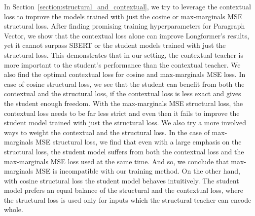 In Section~\ref{section:structural_and_contextual}, we try to leverage the
contextual loss to improve the models trained with just the cosine or
max-marginals MSE structural loss. After finding promising training
hyperparameters for Paragraph Vector, we show that the contextual loss alone
can improve Longformer's results, yet it cannot surpass SBERT or the student
models trained with just the structural loss. This demonstrates that in our
setting, the contextual teacher is more important to the student's performance
than the contextual teacher. We also find the optimal contextual loss for
cosine and max-marginals MSE loss. In case of cosine structural loss, we see
that the student can benefit from both the contextual and the structural loss,
if the contextual loss is less exact and gives the student enough freedom. With
the max-marginals MSE structural loss, the contextual loss needs to be far less
strict and even then it fails to improve the student model trained with just
the structural loss. We also try a more involved ways to weight the contextual
and the structural loss. In the case of max-marginals MSE structural loss, we
find that even with a large emphasis on the structural loss, the student model
suffers from both the contextual loss and the max-marginals MSE loss used at
the same time. And so, we conclude that max-marginals MSE is incompatible with
our training method. On the other hand, with cosine structural loss the student
model behaves intuitively. The student model prefers an equal balance of the
structural and the contextual loss, where the structural loss is used only for
inputs which the structural teacher can encode whole.
